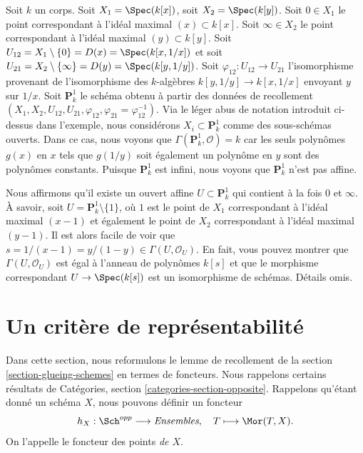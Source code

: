 \begin{example}
\label{example-projective-line}
Soit $k$ un corps.
Soit $X_1 = \Spec(k[x])$,
soit $X_2 = \Spec(k[y])$.
Soit $0 \in X_1$ le point correspondant à l'idéal maximal $(x) \subset
k[x]$. Soit $\infty
\in X_2$ le point correspondant à l'idéal maximal $(y) \subset k[y]$.
Soit $U_{12} = X_1
\setminus \{0\} = D(x) = \Spec(k[x, 1/x])$ et soit $U_{21} = X_2
\setminus \{\infty\} = D(y) = \Spec(k[y, 1/y])$. Soit $\varphi_{12} :
U_{12} \to U_{21}$ l'isomorphisme provenant de l'isomorphisme
des $k$-algèbres $k[y, 1/y] \to k[x, 1/x]$
envoyant $y$ sur $1/x$. Soit $\mathbf{P}^1_k$ le
schéma obtenu à partir des données de recollement $(X_1, X_2, U_{12},
U_{21}, \varphi_{12}, \varphi_{21} =
\varphi_{12}^{-1})$. Via le léger abus de notation introduit ci-dessus
dans l'exemple, nous considérons $X_i \subset
\mathbf{P}^1_k$ comme des sous-schémas ouverts. Dans ce cas, nous
voyons que $\Gamma(\mathbf{P}^1_k, \mathcal{O}) = k$ car les seuls
polynômes $g(x)$ en $x$ tels que $g(1/y)$ soit également un
polynôme en $y$ sont des polynômes constants. Puisque
$\mathbf{P}^1_k$ est infini, nous voyons que $\mathbf{P}^1_k$ n'est pas affine.

\medskip\noindent
Nous affirmons qu'il existe un ouvert affine $U \subset \mathbf{P}^1_k$
qui contient à la fois $0$ et $\infty$. À savoir,
soit $U = \mathbf{P}^1_k \setminus \{1\}$, où $1$ est le point
de $X_1$ correspondant à l'idéal maximal $(x - 1)$ et
également le point de $X_2$ correspondant à l'idéal
maximal $(y - 1)$. Il est alors facile de voir que
$s = 1/(x - 1) = y/(1 - y) \in \Gamma(U, \mathcal{O}_U)$. En
fait, vous pouvez montrer que $\Gamma(U, \mathcal{O}_U)$
est égal à l'anneau de polynômes $k[s]$ et que le
morphisme correspondant $U \to \Spec(k[s])$
est un isomorphisme de schémas. Détails omis.
\end{example}




\section{Un critère de représentabilité}
\label{section-representable}

\noindent
Dans cette section, nous reformulons le lemme de recollement
de la section \ref{section-glueing-schemes} en termes
de foncteurs. Nous rappelons certains résultats de
Catégories, section \ref{categories-section-opposite}. Rappelons
qu'étant donné un schéma $X$, nous pouvons
définir un foncteur
$$
h_X : \Sch^{opp}
\longrightarrow
\textit{Ensembles}, \quad
T \longmapsto \Mor(T, X).
$$
On l'appelle le foncteur des points {\it de $X$}.


